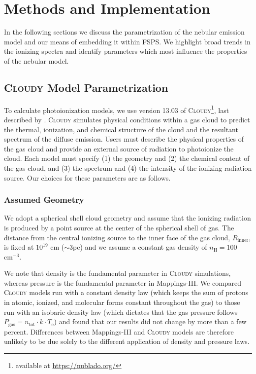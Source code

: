 \documentclass[linenumbers, tighten, trackchanges]{aastex61}%
\newcommand{\FSPS}{{\sc FSPS}\xspace}
\newcommand{\Mappings}{{\sc Mappings-III}\xspace}
\newcommand{\Cloudy}{\textsc{Cloudy}\xspace}
\newcommand{\nH}{\ensuremath{n_{\mathrm{H}}}}
\newcommand{\cm}[1]{\ensuremath{\mathrm{cm}^{#1}}}
\newcommand{\Rin}{\ensuremath{R_{\mathrm{inner}}}}
\begin{document}
\section{Methods and Implementation}\label{sec:methods}

In the following sections we discuss the parametrization of the nebular emission model and our means of embedding it within \FSPS. We highlight broad trends in the ionizing spectra and identify parameters which most influence the properties of the nebular model.

\subsection{\Cloudy Model Parametrization}\label{sec:methods:cloudy}

To calculate photoionization models, we use version 13.03 of \Cloudy\footnote{available at \url{https://nublado.org/}}, last described by \citet{Ferland13}. \Cloudy simulates physical conditions within a gas cloud to predict the thermal, ionization, and chemical structure of the cloud and the resultant spectrum of the diffuse emission. Users must describe the physical properties of the gas cloud and provide an external source of radiation to photoionize the cloud. Each model must specify (1) the geometry and (2) the chemical content of the gas cloud, and (3) the spectrum and (4) the intensity of the ionizing radiation source. Our choices for these parameters are as follows.

\subsubsection{Assumed Geometry}\label{sec:methods:cloudy:geom}


We adopt a spherical shell cloud geometry and assume that the ionizing radiation is produced by a point source at the center of the spherical shell of gas. The distance from the central ionizing source to the inner face of the gas cloud, \Rin{}, is fixed at $10^{19}$ cm ($\sim 3$pc) and we assume a constant gas density of $\nH=100\;$\cm{-3}.

We note that density is the fundamental parameter in \Cloudy simulations, whereas pressure is the fundamental parameter in \Mappings. We compared \Cloudy models run with a constant density law (which keeps the sum of protons in atomic, ionized, and molecular forms constant throughout the gas) to those run with an isobaric density law (which dictates that the gas pressure follows $P_{\mathrm{gas}} = n_{\mathrm{tot}} \cdot k \cdot T_{\mathrm{e}}$) and found that our results did not change by more than a few percent. Differences between \Mappings and \Cloudy models are therefore unlikely to be due solely to the different application of density and pressure laws.
\end{document}
